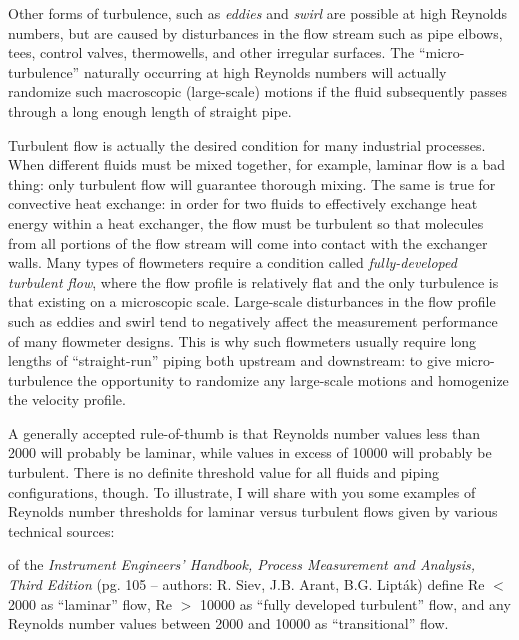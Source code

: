 Other forms of turbulence, such as \textit{eddies} and \textit{swirl} are possible at high Reynolds numbers, but are caused by disturbances in the flow stream such as pipe elbows, tees, control valves, thermowells, and other irregular surfaces.  The ``micro-turbulence'' naturally occurring at high Reynolds numbers will actually randomize such macroscopic (large-scale) motions if the fluid subsequently passes through a long enough length of straight pipe.  

Turbulent flow is actually the desired condition for many industrial processes.  When different fluids must be mixed together, for example, laminar flow is a bad thing: only turbulent flow will guarantee thorough mixing.  The same is true for convective heat exchange: in order for two fluids to effectively exchange heat energy within a heat exchanger, the flow must be turbulent so that molecules from all portions of the flow stream will come into contact with the exchanger walls.  Many types of flowmeters require a condition called \textit{fully-developed turbulent flow}, where the flow profile is relatively flat and the only turbulence is that existing on a microscopic scale.  Large-scale disturbances in the flow profile such as eddies and swirl tend to negatively affect the measurement performance of many flowmeter designs.  This is why such flowmeters usually require long lengths of ``straight-run'' piping both upstream and downstream: to give micro-turbulence the opportunity to randomize any large-scale motions and homogenize the velocity profile.  

\filbreak

A generally accepted rule-of-thumb is that Reynolds number values less than 2000 will probably be laminar, while values in excess of 10000 will probably be turbulent.  There is no definite threshold value for all fluids and piping configurations, though.  To illustrate, I will share with you some examples of Reynolds number thresholds for laminar versus turbulent flows given by various technical sources:      

\vskip 10pt

\noindent
{} of the \textit{Instrument Engineers' Handbook, Process Measurement and Analysis, Third Edition} (pg. 105 -- authors: R. Siev, J.B. Arant, B.G. Lipt\'ak) define Re $<$ 2000 as ``laminar'' flow, Re $>$ 10000 as ``fully developed turbulent'' flow, and any Reynolds number values between 2000 and 10000 as ``transitional'' flow.

